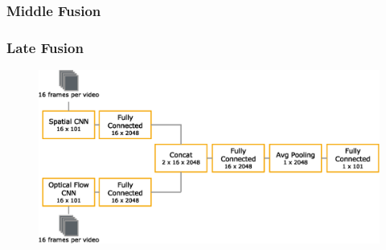 \subsubsection{Middle Fusion}


\subsubsection{Late Fusion}


\begin{figure}[!htb]
	\centering
	\includegraphics[scale=.7]{images/late_fusion.eps}
	\caption{}
	\label{fig:late_fusion}
\end{figure}